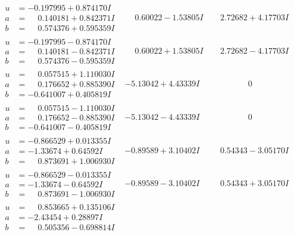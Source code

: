 \documentclass[1p]{elsarticle_modified}
\theoremstyle{definition}
\begin{document}
$$\begin{array}{c|c|c}
\begin{aligned}
u &= -0.197995 + 0.874170 I \\
a &= \phantom{-}0.140181 + 0.842371 I \\
b &= \phantom{-}0.574376 + 0.595359 I\end{aligned}
 & \phantom{-}0.60022 - 1.53805 I & \phantom{-}2.72682 + 4.17703 I \\ \hline\begin{aligned}
u &= -0.197995 - 0.874170 I \\
a &= \phantom{-}0.140181 - 0.842371 I \\
b &= \phantom{-}0.574376 - 0.595359 I\end{aligned}
 & \phantom{-}0.60022 + 1.53805 I & \phantom{-}2.72682 - 4.17703 I \\ \hline\begin{aligned}
u &= \phantom{-}0.057515 + 1.110030 I \\
a &= \phantom{-}0.176652 + 0.885390 I \\
b &= -0.641007 + 0.405819 I\end{aligned}
 & -5.13042 + 4.43339 I & \phantom{-0.000000 } 0 \\ \hline\begin{aligned}
u &= \phantom{-}0.057515 - 1.110030 I \\
a &= \phantom{-}0.176652 - 0.885390 I \\
b &= -0.641007 - 0.405819 I\end{aligned}
 & -5.13042 - 4.43339 I & \phantom{-0.000000 } 0 \\ \hline\begin{aligned}
u &= -0.866529 + 0.013355 I \\
a &= -1.33674 + 0.64592 I \\
b &= \phantom{-}0.873691 + 1.006930 I\end{aligned}
 & -0.89589 + 3.10402 I & \phantom{-}0.54343 - 3.05170 I \\ \hline\begin{aligned}
u &= -0.866529 - 0.013355 I \\
a &= -1.33674 - 0.64592 I \\
b &= \phantom{-}0.873691 - 1.006930 I\end{aligned}
 & -0.89589 - 3.10402 I & \phantom{-}0.54343 + 3.05170 I \\ \hline\begin{aligned}
u &= \phantom{-}0.853665 + 0.135106 I \\
a &= -2.43454 + 0.28897 I \\
b &= \phantom{-}0.505356 - 0.698814 I\end{aligned}

\end{array}$$
\end{document}
